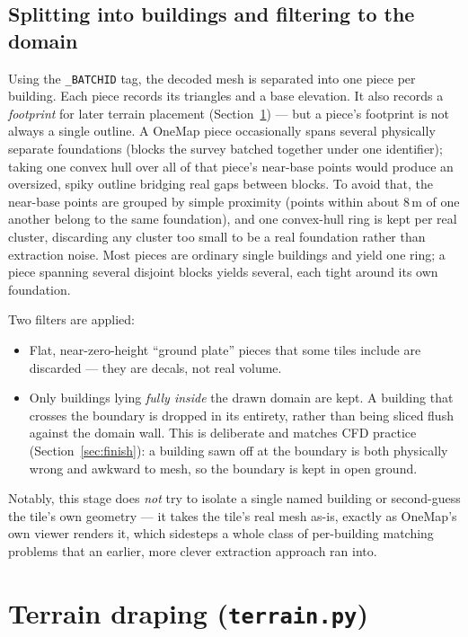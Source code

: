 \documentclass[11pt]{article}
\newcommand{\code}[1]{\texttt{#1}}
\begin{document}
\subsection{Splitting into buildings and filtering to the domain}

Using the \code{\_BATCHID} tag, the decoded mesh is separated into one piece per building. Each
piece records its triangles and a base elevation. It also records a \emph{footprint} for later
terrain placement (Section~\ref{sec:terrain}) --- but a piece's footprint is not always a single
outline. A OneMap piece occasionally spans several physically separate foundations (blocks the
survey batched together under one identifier); taking one convex hull over all of that piece's
near-base points would produce an oversized, spiky outline bridging real gaps between blocks. To
avoid that, the near-base points are grouped by simple proximity (points within about 8\,m of one
another belong to the same foundation), and one convex-hull ring is kept per real cluster,
discarding any cluster too small to be a real foundation rather than extraction noise. Most
pieces are ordinary single buildings and yield one ring; a piece spanning several disjoint blocks
yields several, each tight around its own foundation.

Two filters are applied:

\begin{itemize}[leftmargin=1.4cm]
  \item Flat, near-zero-height ``ground plate'' pieces that some tiles include are discarded ---
    they are decals, not real volume.
  \item Only buildings lying \emph{fully inside} the drawn domain are kept. A building that
    crosses the boundary is dropped in its entirety, rather than being sliced flush against the
    domain wall. This is deliberate and matches CFD practice (Section~\ref{sec:finish}): a
    building sawn off at the boundary is both physically wrong and awkward to mesh, so the
    boundary is kept in open ground.
\end{itemize}

Notably, this stage does \emph{not} try to isolate a single named building or second-guess the
tile's own geometry --- it takes the tile's real mesh as-is, exactly as OneMap's own viewer
renders it, which sidesteps a whole class of per-building matching problems that an earlier,
more clever extraction approach ran into.

\section{Terrain draping (\code{terrain.py})}
\label{sec:terrain}
\end{document}
